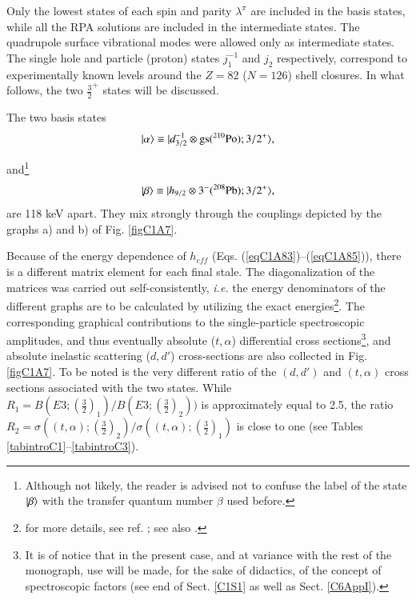 Only the lowest states of each spin and parity $\lambda^{\pi}$ are included in the basis states, while all the RPA solutions are included in the intermediate states. The quadrupole surface vibrational modes were allowed only as intermediate states. The single hole and particle (proton) states $j_1^{-1}$ and $j_2$ respectively, correspond to experimentally known levels around the $Z = 82$ ($N=126$) shell closures.  
In what follows, the  two $\frac{3}{2}^+$ states will be discussed.

The two basis states 
  \begin{align}\label{eqC1A89} 
   |{\alpha} \rangle\equiv |{d_{3/2}^{-1}\otimes \text{gs}(^{210}\text{Po});3/2^+} \rangle,
    \end{align} 


and\footnote{Although not likely, the reader is advised not to confuse the label of the state $|{\beta} \rangle$ with the transfer quantum number $\beta$ used before.}
  \begin{align}\label{eqC1A90} 
      |{\beta} \rangle\equiv |{h_{9/2}\otimes 3^-(^{208}\text{Pb});3/2^+} \rangle,
    \end{align} 
are 118 keV apart. They mix strongly through the couplings depicted by the graphs a) and b) of Fig. \ref{figC1A7}. 


Because of the energy dependence of $h_{eff}$ (Eqs. (\ref{eqC1A83})--(\ref{eqC1A85})), there is a different matrix element 
for each final stale. The diagonalization of the matrices was carried out self-consistently, \textit{i.e.} the energy denominators of the different graphs are to be calculated by utilizing the exact energies\footnote{for more details, see ref. \cite{Bortignon:77}; see also \cite{Bortignon:76}.}. 
The corresponding graphical contributions to the single-particle spectroscopic amplitudes, and thus eventually absolute ($t,\alpha$) differential cross sections\footnote{It is of notice that in the present case, and at variance with the rest of the monograph, use will be made, for the sake of  didactics, of the concept of spectroscopic factors (see end of Sect. \ref{C1S1} as well as Sect. \ref{C6AppI}).}, and absolute inelastic scattering ($d,d'$) cross-sections are also collected in Fig. \ref{figC1A7}. To be noted is the very different ratio of the $(d,d')$ and $(t,\alpha)$ cross sections associated with the two states. While $R_1=B(E3;(\frac{3}{2})_1)/B(E3;(\frac{3}{2})_2))$ is approximately equal to 2.5, the ratio $R_2=\sigma((t,\alpha);(\frac{3}{2})_2)/\sigma((t,\alpha);(\frac{3}{2})_1)$ is close to one (see Tables \ref{tabintroC1}--\ref{tabintroC3}).


